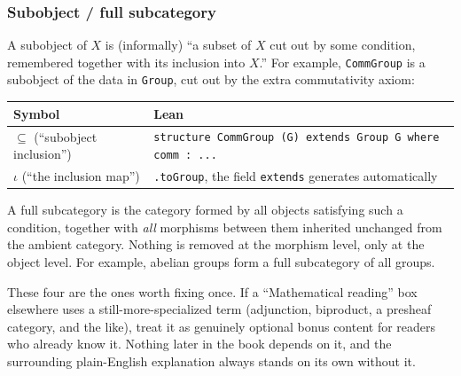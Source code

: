 \subsubsection{Subobject / full subcategory}\label{sec:02-terminology-and-coc:01-terminology:10}

A subobject of \(X\) is (informally) ``a subset of \(X\) cut out by some condition, remembered together with its inclusion into \(X\).'' For example, \texttt{CommGroup} is a subobject of the data in \texttt{Group}, cut out by the extra commutativity axiom:

\begin{center}

\end{center}

\begin{longtable}[]{@{}
  >{\raggedright\arraybackslash}p{}
  >{\raggedright\arraybackslash}p{}@{}}
\toprule\noalign{}
\begin{minipage}[b]{\linewidth}\raggedright
Symbol
\end{minipage} & \begin{minipage}[b]{\linewidth}\raggedright
Lean
\end{minipage} \\
\midrule\noalign{}
\endhead
\bottomrule\noalign{}
\endlastfoot
\(\subseteq\) (``subobject inclusion'') & \texttt{structure CommGroup (G) extends Group G where comm : ...} \\
\(\iota\) (``the inclusion map'') & \texttt{.toGroup}, the field \texttt{extends} generates automatically \\
\end{longtable}

A full subcategory is the category formed by all objects satisfying such a condition, together with \emph{all} morphisms between them inherited unchanged from the ambient category. Nothing is removed at the morphism level, only at the object level. For example, abelian groups form a full subcategory of all groups.

These four are the ones worth fixing once. If a ``Mathematical reading'' box elsewhere uses a still-more-specialized term (adjunction, biproduct, a presheaf category, and the like), treat it as genuinely optional bonus content for readers who already know it. Nothing later in the book depends on it, and the surrounding plain-English explanation always stands on its own without it.

